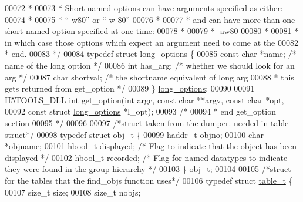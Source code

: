 \begin{DoxyCode}
00072 \textcolor{comment}{ *}
00073 \textcolor{comment}{ * Short named options can have arguments specified as either:}
00074 \textcolor{comment}{ *}
00075 \textcolor{comment}{ *   ``-w80'' or ``-w 80''}
00076 \textcolor{comment}{ *}
00077 \textcolor{comment}{ * and can have more than one short named option specified at one time:}
00078 \textcolor{comment}{ *}
00079 \textcolor{comment}{ *   -aw80}
00080 \textcolor{comment}{ *}
00081 \textcolor{comment}{ * in which case those options which expect an argument need to come at the}
00082 \textcolor{comment}{ * end.}
00083 \textcolor{comment}{ */}
00084 \textcolor{keyword}{typedef} \textcolor{keyword}{struct }\hyperlink{structlong__options}{long\_options} \{
00085     \textcolor{keyword}{const} \textcolor{keywordtype}{char}  *name;          \textcolor{comment}{/* name of the long option              */}
00086     \textcolor{keywordtype}{int}          has\_arg;       \textcolor{comment}{/* whether we should look for an arg    */}
00087     \textcolor{keywordtype}{char}         shortval;      \textcolor{comment}{/* the shortname equivalent of long arg}
00088 \textcolor{comment}{                                 * this gets returned from get\_option   */}
00089 \} \hyperlink{structlong__options}{long\_options};
00090 
00091 H5TOOLS\_DLL \textcolor{keywordtype}{int}    get\_option(\textcolor{keywordtype}{int} argc, \textcolor{keyword}{const} \textcolor{keywordtype}{char} **argv, \textcolor{keyword}{const} \textcolor{keywordtype}{char} *opt,
00092                          \textcolor{keyword}{const} \textcolor{keyword}{struct} \hyperlink{structlong__options}{long\_options} *l\_opt);
00093 \textcolor{comment}{/*}
00094 \textcolor{comment}{ * end get\_option section}
00095 \textcolor{comment}{ */}
00096 
00097 \textcolor{comment}{/*struct taken from the dumper. needed in table struct*/}
00098 \textcolor{keyword}{typedef} \textcolor{keyword}{struct }\hyperlink{structobj__t}{obj\_t} \{
00099     haddr\_t objno;
00100     \textcolor{keywordtype}{char} *objname;
00101     hbool\_t displayed;          \textcolor{comment}{/* Flag to indicate that the object has been displayed */}
00102     hbool\_t recorded;           \textcolor{comment}{/* Flag for named datatypes to indicate they were found in the group
       hierarchy */}
00103 \} \hyperlink{structobj__t}{obj\_t};
00104 
00105 \textcolor{comment}{/*struct for the tables that the find\_objs function uses*/}
00106 \textcolor{keyword}{typedef} \textcolor{keyword}{struct }\hyperlink{structtable__t}{table\_t} \{
00107     \textcolor{keywordtype}{size\_t} size;
00108     \textcolor{keywordtype}{size\_t} nobjs;

\end{DoxyCode}
